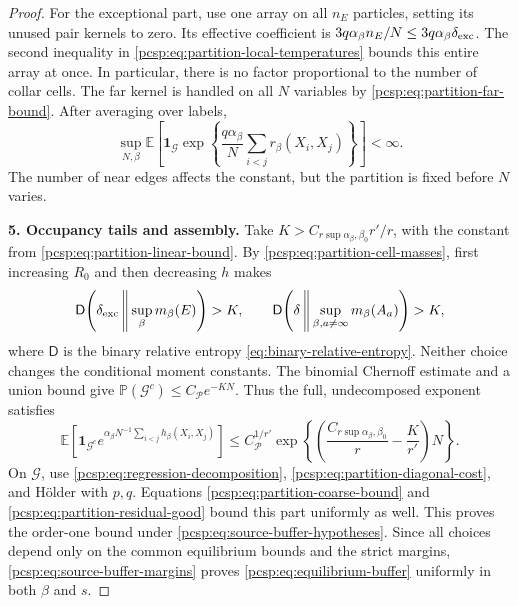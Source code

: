 \documentclass[11pt,reqno]{amsart}
\numberwithin{equation}{section}
\theoremstyle{plain}
\theoremstyle{definition}
\newcommand{\E}{\mathbb E}
\newcommand{\Pb}{\mathbb P}
\newcommand{\be}{\beta}
\newcommand{\step}[1]{\par\medskip\noindent\textbf{#1}}
\begin{document}
\begin{proof}
For the exceptional part, use one array on all $n_E$ particles, setting its unused pair kernels to zero. Its effective coefficient is $3q\alpha_\be n_E/N\leq3q\alpha_\be\delta_{\rm exc}$. The second inequality in \eqref{pcsp:eq:partition-local-temperatures} bounds this entire array at once. In particular, there is no factor proportional to the number of collar cells. The far kernel is handled on all $N$ variables by \eqref{pcsp:eq:partition-far-bound}. After averaging over labels,
\begin{equation}\label{pcsp:eq:partition-residual-good}
 \sup_{N,\be}\E\left[\mathbf1_{\mathcal G}
       \exp\left\{\frac{q\alpha_\be}{N}\sum_{i<j}r_\be(X_i,X_j)\right\}\right]
 <\infty.
\end{equation}
The number of near edges affects the constant, but the partition is fixed before $N$ varies.

\step{5. Occupancy tails and assembly.}
Take $K>C_{r\sup\alpha_\be,\be_0}r'/r$, with the constant from \eqref{pcsp:eq:partition-linear-bound}. By \eqref{pcsp:eq:partition-cell-masses}, first increasing $R_0$ and then decreasing $h$ makes
\begin{equation}\label{pcsp:eq:partition-Chernoff-choice}
 \mathsf D\!\left(\delta_{\rm exc}\,\middle\Vert\,
              \sup_\be m_\be(E)\right)>K,
 \qquad
 \mathsf D\!\left(\delta\,\middle\Vert\,
              \sup_{\be,a\ne\infty}m_\be(A_a)\right)>K,
\end{equation}
where $\mathsf D$ is the binary relative entropy \eqref{eq:binary-relative-entropy}. Neither choice changes the conditional moment constants. The binomial Chernoff estimate and a union bound give $\Pb(\mathcal G^c)\leq C_{\mathscr P}e^{-KN}$. Thus the full, undecomposed exponent satisfies
\begin{equation}\label{pcsp:eq:partition-bad-bound}
 \E\left[\mathbf1_{\mathcal G^c}e^{\alpha_\be N^{-1}\sum_{i<j}h_\be(X_i,X_j)}\right]
 \leq C_{\mathscr P}^{1/r'}
       \exp\left\{\left(\frac{C_{r\sup\alpha_\be,\be_0}}r
                              -\frac K{r'}\right)N\right\}.
\end{equation}
On $\mathcal G$, use \eqref{pcsp:eq:regression-decomposition}, \eqref{pcsp:eq:partition-diagonal-cost}, and H\"older with $p,q$. Equations \eqref{pcsp:eq:partition-coarse-bound} and \eqref{pcsp:eq:partition-residual-good} bound this part uniformly as well. This proves the order-one bound under \eqref{pcsp:eq:source-buffer-hypotheses}. Since all choices depend only on the common equilibrium bounds and the strict margins, \eqref{pcsp:eq:source-buffer-margins} proves \eqref{pcsp:eq:equilibrium-buffer} uniformly in both $\be$ and $s$.
\end{proof}
\end{document}
